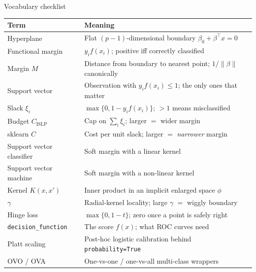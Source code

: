 \documentclass[aspectratio=169,11pt]{beamer}
\begin{document}
\begin{frame}{Vocabulary checklist}
  \scriptsize
  \begin{tabular}{ll}
    \toprule
    \textbf{Term} & \textbf{Meaning} \\
    \midrule
    Hyperplane & Flat $(p-1)$-dimensional boundary $\beta_0+\beta^\top x=0$ \\
    Functional margin & $y_i f(x_i)$; positive iff correctly classified \\
    Margin $M$ & Distance from boundary to nearest point; $1/\|\beta\|$ canonically \\
    Support vector & Observation with $y_i f(x_i)\le1$; the only ones that matter \\
    Slack $\xi_i$ & $\max\{0,1-y_if(x_i)\}$; $>1$ means misclassified \\
    Budget $C_{\text{ISLP}}$ & Cap on $\sum_i\xi_i$; larger $=$ wider margin \\
    sklearn $C$ & Cost per unit slack; larger $=$ \emph{narrower} margin \\
    Support vector classifier & Soft margin with a linear kernel \\
    Support vector machine & Soft margin with a non-linear kernel \\
    Kernel $K(x,x')$ & Inner product in an implicit enlarged space $\phi$ \\
    $\gamma$ & Radial-kernel locality; large $\gamma$ $=$ wiggly boundary \\
    Hinge loss & $\max\{0,1-t\}$; zero once a point is safely right \\
    \texttt{decision\_function} & The score $f(x)$; what ROC curves need \\
    Platt scaling & Post-hoc logistic calibration behind \texttt{probability=True} \\
    OVO / OVA & One-vs-one / one-vs-all multi-class wrappers \\
    \bottomrule
  \end{tabular}
\end{frame}
\end{document}

